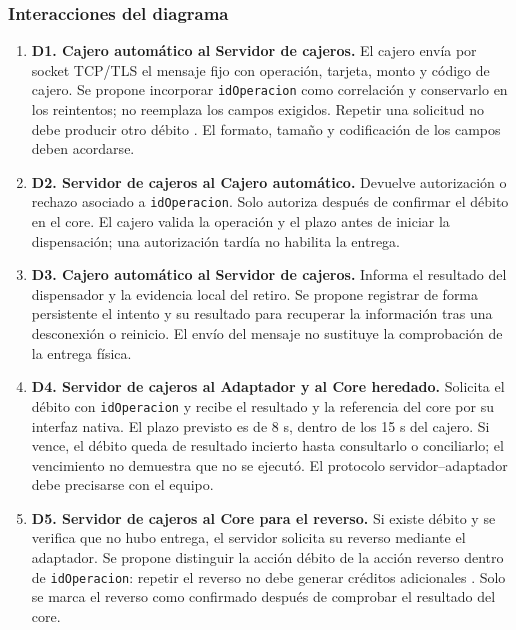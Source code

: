 \documentclass[12pt,a4paper]{article}
\begin{document}
\subsubsection{Interacciones del diagrama}

\begin{enumerate}
    \item \textbf{D1. Cajero automático al Servidor de cajeros.}
    El cajero envía por socket TCP/TLS el mensaje fijo con operación, tarjeta, monto y código de cajero. Se propone incorporar \texttt{idOperacion} como correlación y conservarlo en los reintentos; no reemplaza los campos exigidos. Repetir una solicitud no debe producir otro débito \cite{featonbyretries}. El formato, tamaño y codificación de los campos deben acordarse.

    \item \textbf{D2. Servidor de cajeros al Cajero automático.}
    Devuelve autorización o rechazo asociado a \texttt{idOperacion}. Solo autoriza después de confirmar el débito en el core. El cajero valida la operación y el plazo antes de iniciar la dispensación; una autorización tardía no habilita la entrega.

    \item \textbf{D3. Cajero automático al Servidor de cajeros.}
    Informa el resultado del dispensador y la evidencia local del retiro. Se propone registrar de forma persistente el intento y su resultado para recuperar la información tras una desconexión o reinicio. El envío del mensaje no sustituye la comprobación de la entrega física.

    \item \textbf{D4. Servidor de cajeros al Adaptador y al Core heredado.}
    Solicita el débito con \texttt{idOperacion} y recibe el resultado y la referencia del core por su interfaz nativa. El plazo previsto es de 8 s, dentro de los 15 s del cajero. Si vence, el débito queda de resultado incierto hasta consultarlo o conciliarlo; el vencimiento no demuestra que no se ejecutó. El protocolo servidor--adaptador debe precisarse con el equipo.

    \item \textbf{D5. Servidor de cajeros al Core para el reverso.}
    Si existe débito y se verifica que no hubo entrega, el servidor solicita su reverso mediante el adaptador. Se propone distinguir la acción débito de la acción reverso dentro de \texttt{idOperacion}: repetir el reverso no debe generar créditos adicionales \cite{featonbyretries}. Solo se marca el reverso como confirmado después de comprobar el resultado del core.


\end{enumerate}
\end{document}
